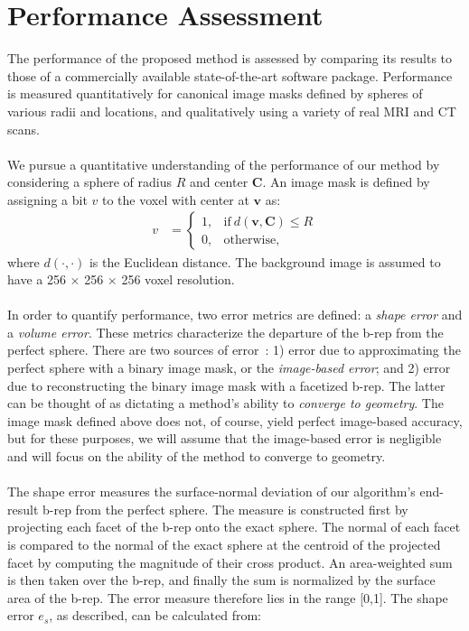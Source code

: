 \section{Performance Assessment}
%

The performance of the proposed method is assessed by comparing its results to those of a commercially available state-of-the-art software package. Performance is measured quantitatively for canonical image masks defined by spheres of various radii and locations, and qualitatively using a variety of real MRI and CT scans. \\ \\
%
We pursue a quantitative understanding of the performance of our method by considering a sphere of radius $R$ and center $\bm{C}$.  An image mask is defined by assigning a bit $v$ to the voxel with center at $\bm{v}$ as:
\begin{align} 
	v &=  \begin{cases}
		1, & \text{if}\ d \left(\bm{v},\bm{C}\right) \le R \\
		0, & \text{otherwise},
	\end{cases}
\end{align}
where $d(\cdot,\cdot)$ is the Euclidean distance. The background image is assumed to have a 256 $\times$ 256 $\times$ 256 voxel resolution. \\ \\
%
In order to quantify performance, two error metrics are defined: a {\em shape error} and a {\em volume error}. These metrics characterize the departure of the b-rep from the perfect sphere.  There are two sources of error~\cite{young_2008}: 1) error due to approximating the perfect sphere with a binary image mask, or the {\em image-based error}; and 2) error due to reconstructing the binary image mask with a facetized b-rep.  The latter can be thought of as dictating a method's ability to {\em converge to geometry}. The image mask defined above does not, of course, yield perfect image-based accuracy, but for these purposes, we will assume that the image-based error is negligible and will focus on the ability of the method to converge to geometry.\\ \\
%
The shape error measures the surface-normal deviation of our algorithm's end-result b-rep from the perfect sphere. The measure is constructed first by projecting each facet of the b-rep onto the exact sphere. The normal of each facet is compared to the normal of the exact sphere at the centroid of the projected facet by computing the magnitude of their cross product. An area-weighted sum is then taken over the b-rep, and finally the sum is normalized by the surface area of the b-rep. The error measure therefore lies in the range [0,1]. The shape error $e_s$, as described, can be calculated from:
